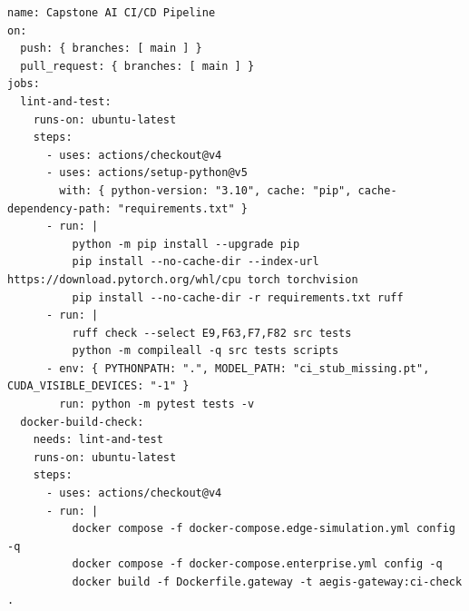 \begin{lstlisting}[basicstyle=\fontsize{6.8pt}{7.6pt}\selectfont\ttfamily, aboveskip=1pt, belowskip=1pt, caption={Automated GitHub Actions CI/CD Pipeline (\nolinkurl{.github/workflows/ci.yml}).}, label={lst:app_ci}]
name: Capstone AI CI/CD Pipeline
on:
  push: { branches: [ main ] }
  pull_request: { branches: [ main ] }
jobs:
  lint-and-test:
    runs-on: ubuntu-latest
    steps:
      - uses: actions/checkout@v4
      - uses: actions/setup-python@v5
        with: { python-version: "3.10", cache: "pip", cache-dependency-path: "requirements.txt" }
      - run: |
          python -m pip install --upgrade pip
          pip install --no-cache-dir --index-url https://download.pytorch.org/whl/cpu torch torchvision
          pip install --no-cache-dir -r requirements.txt ruff
      - run: |
          ruff check --select E9,F63,F7,F82 src tests
          python -m compileall -q src tests scripts
      - env: { PYTHONPATH: ".", MODEL_PATH: "ci_stub_missing.pt", CUDA_VISIBLE_DEVICES: "-1" }
        run: python -m pytest tests -v
  docker-build-check:
    needs: lint-and-test
    runs-on: ubuntu-latest
    steps:
      - uses: actions/checkout@v4
      - run: |
          docker compose -f docker-compose.edge-simulation.yml config -q
          docker compose -f docker-compose.enterprise.yml config -q
          docker build -f Dockerfile.gateway -t aegis-gateway:ci-check .
\end{lstlisting}

